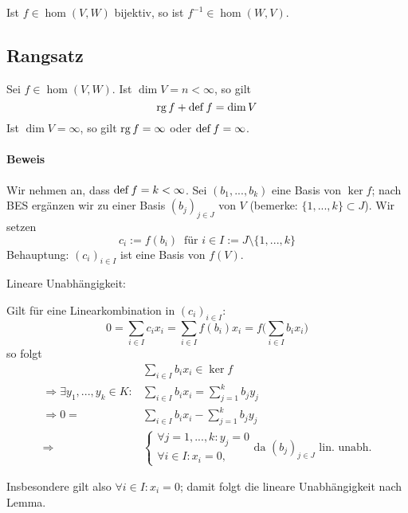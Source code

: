 	Ist $ f\in \hom (V,W) $ bijektiv, so ist $ f^{-1}\in \hom (W,V) $.

\subsection{Rangsatz}
	\begin{Satz}[Rangsatz]
		Sei $ f\in \hom (V,W) $. Ist $ \dim V = n < \infty $,  so gilt
                    \[\operatorname{rg} f + \operatorname{def} f = \dim V\]
                Ist $ \dim V = \infty $, so gilt $ \operatorname{rg} f = \infty $ oder $ \operatorname{def} f = \infty $.
	\end{Satz}

\paragraph{Beweis}
	Wir nehmen an, dass $ \operatorname{def} f = k < \infty $.
	Sei $ (b_1,...,b_k) $ eine Basis von $ \ker f $;
	nach BES ergänzen wir zu einer Basis $ (b_j)_{j\in J} $ von $ V $ (bemerke: $ \{1,...,k\}\subset J $).
	Wir setzen 
	\[ c_i:=f(b_i)\ \text{ für } i\in I:=J\setminus \{1,...,k\} \]
	Behauptung: $(c_i)_{i\in I}$ ist eine Basis von $f(V)$.
	
        Lineare Unabhängigkeit:
        \begin{addmargin}[25pt]{0pt}
	Gilt für eine Linearkombination in $(c_i)_{i\in I}$:
		\[ 0=\sum_{i\in I}c_ix_i = \sum_{i\in I}f(b_i)x_i = f\Big(\sum_{i\in I}b_ix_i\Big)
		 \]
	so folgt
	\begin{align*}
		&\sum_{i\in I}b_ix_i \in \ker f\\
		\Rightarrow \exists y_1,...,y_k\in K:&\sum_{i\in I}b_ix_i=\sum_{j=1}^{k}b_jy_j\\
		\Rightarrow 0 = &\sum_{i\in I}b_ix_i - \sum_{j=1}^{k}b_jy_j\\
		\Rightarrow&
		\begin{cases}
			\forall j = 1, ... ,k:y_j=0\\
			\forall i\in I: x_i = 0,
		\end{cases}
		\text{da $(b_j)_{j\in J}$ lin. unabh.}
	\end{align*}
			
	Insbesondere gilt also $\forall i\in I: x_i = 0$; damit folgt die lineare Unabhängigkeit nach Lemma.
	\end{addmargin}

